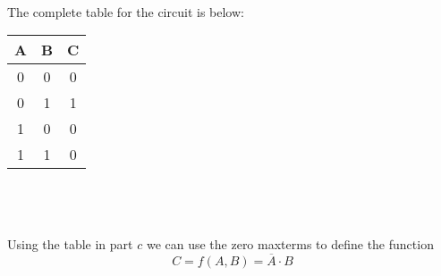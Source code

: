 \documentclass[11pt,reqno]{article}
\begin{document}
\noindent{}\\ 


The complete table for the circuit is below:\\

\begin{tabular}{| c | c | c |}
\hline
A & B & C \\ \hline
0 & 0 & 0 \\ \hline
0 & 1 & 1 \\ \hline
1 & 0 & 0 \\ \hline
1 & 1 & 0 \\ \hline
\end{tabular}\\ \\

\noindent{}\\ 

Using the table in part $c$ we can use the zero maxterms to define the function
\[ C = f(A,B) = \overline{A} \cdot B\]
\end{document}
